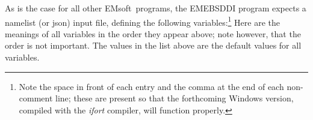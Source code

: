 \documentclass[DIV=calc, paper=letter, fontsize=11pt]{scrartcl}	 %
\newcommand{\ctp}{\textsf{EMsoft}}
\begin{document}
As is the case for all other \ctp\ programs, the \textsf{EMEBSDDI} program expects a namelist (or json) input file, defining the following variables:\footnote{Note
the space in front of each entry and the comma at the end of each non-comment line; these are present so that the forthcoming Windows version, compiled with the \textit{ifort} compiler, will function properly.}
Here are the meanings of all variables in the order they appear above; note however, that the order is not important.  The values in the list above are the default values
for all variables.
\newcommand{\entry}[1]{\item \textsf{\color{blue}#1:}}
\newcommand{\entryd}[1]{\item \textsf{{\color{blue}#1} {\color{red}[to be removed in later \ctp\ version]:}}}
\end{document}
